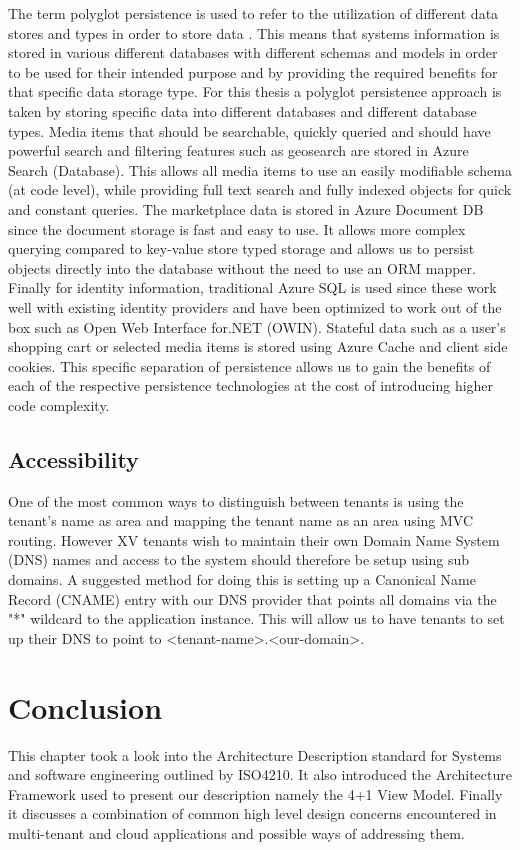 The term polyglot persistence is used to refer to the utilization of different data stores and types in order to store data \cite{Sadalage2012-zw}. This means that systems information is stored in various different databases with different schemas and models in order to be used for their intended purpose and by providing the required benefits for that specific data storage type. For this thesis a polyglot persistence approach is taken by storing specific data into different databases and different database types. Media items that should be searchable, quickly queried and should have powerful search and filtering features such as geosearch are stored in Azure Search  (Database). This allows all media items to use an easily modifiable schema (at code level), while providing full text search and fully indexed objects for quick and constant queries. The marketplace data is stored in Azure Document DB  since the document storage is fast and easy to use. It allows more complex querying compared to key-value store typed storage and allows us to persist objects directly into the database without the need to use an ORM mapper. Finally for identity information, traditional Azure SQL is used since these work well with existing identity providers and have been optimized to work out of the box such as Open Web Interface for.NET (OWIN). Stateful data such as a user's shopping cart or selected media items is stored using Azure Cache and client side cookies. This specific separation of persistence allows us to gain the benefits of each of the respective persistence technologies at the cost of introducing higher code complexity.


\subsection{Accessibility}

One of the most common ways to distinguish between tenants is using the tenant's name as area and mapping the tenant name as an area using MVC routing. However XV tenants wish to maintain their own Domain Name System (DNS) names and access to the system should therefore be setup using sub domains. A suggested method for doing this is setting up a Canonical Name Record (CNAME) entry with our DNS provider that points all domains via the "*" wildcard to the application instance. This will allow us to have tenants to set up their DNS to point to <tenant-name>.<our-domain>.


\section{Conclusion}
This chapter took a look into the Architecture Description standard for Systems and software engineering outlined by ISO4210. It also introduced the Architecture Framework used to present our description namely the 4+1 View Model. Finally it discusses a combination of common high level design concerns encountered in multi-tenant and cloud applications and possible ways of addressing them. 